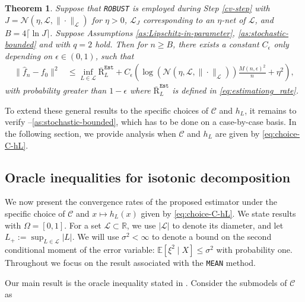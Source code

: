 \documentclass[12pt]{article}
\newtheorem{theorem}{Theorem}[section]
\begin{document}
\begin{theorem}\label{thm:R2Q2-robust}
    Suppose that \texttt{ROBUST} is employed during Step \ref{cv-step} with $J = \mathcal{\mathcal{N}\left(\eta, \mathcal{L}, \|\cdot\|_{\mathcal{L}}\right)}$ for $\eta > 0$, $\mathcal{L}_J$ corresponding to an $\eta$-net of $\mathcal{L}$, and $B = 4 \lceil \ln J \rceil$. Suppose Assumptions \ref{as:Lipschitz-in-parameter}, \ref{as:stochastic-bounded} and  with $q=2$ hold. Then for $n \ge B$, there exists a constant $C_\epsilon$ only depending on $\epsilon \in (0,1)$, such that 
            \begin{equation}
            \begin{aligned}
        \|\widehat{f}_n-f_0\|^2 &\le \inf_{L\in \mathcal{L}}\overline{\mathrm{R}}_L^{\mathtt{Est}} + 
 C_\epsilon  \left(\log \left(\mathcal{N}\left(\eta, \mathcal{L}, \|\cdot\|_{\mathcal{L}}\right)\right)\frac{M(n,\epsilon)^2}{n} + \eta^2\right),
            \end{aligned}
    \end{equation}
    with probability greater than $1-\epsilon$ where $\overline{\mathrm{R}}^{\mathtt{Est}}_L$ is defined in \eqref{eq:estimationg_rate}.
\end{theorem}

To extend these general results to the specific choices of $\mathcal{C}$ and $h_L$, it remains to verify --\ref{as:stochastic-bounded}, which has to be done on a case-by-case basis. In the following section, we provide analysis when $\mathcal{C}$ and $h_L$ are given by \eqref{eq:choice-C-hL}.

\subsection{Oracle inequalities for isotonic decomposition}\label{sec:oracle-inequality-isotonic}
We now present the convergence rates of the proposed estimator under the specific choice of $\mathcal{C}$ and $x \mapsto h_L(x)$ given by \eqref{eq:choice-C-hL}. We state results with $\Omega = [0,1]$. For a set $\mathcal{L} \subset \mathbb{R}$, we use $|\mathcal{L}|$ to denote its diameter, and let $L_{+}:=\sup _{L \in \mathcal{L}}|L|$. We will use $\sigma^2 < \infty$ to denote a bound on the second conditional moment of the error variable: $\mathbb{E}\left[\xi^2\mid X\right] \leq \sigma^2$ with probability one. Throughout we focus on the result associated with the \texttt{MEAN} method.

Our main result is the oracle inequality stated in . Consider the submodels of $\mathcal{C}$ as
\end{document}
